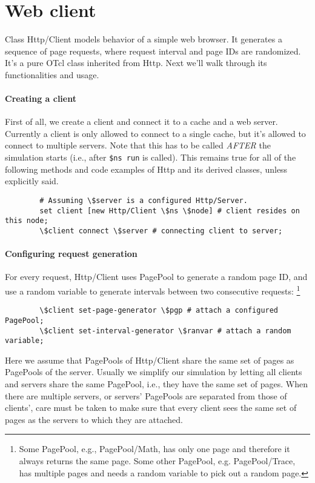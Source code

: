 \section{Web client}
\label{sec:webcache-client}

Class Http/Client models behavior of a simple web browser. It
generates a sequence of page requests, where request interval and page 
IDs are randomized. It's a pure OTcl class inherited from Http. 
Next we'll walk through its functionalities and usage.

\paragraph{Creating a client}

First of all, we create a client and connect it to a cache and a web server.
Currently a client is only allowed to connect to a single cache, but it's 
allowed to connect to multiple servers. Note that this has to be called 
\emph{AFTER} the simulation starts (i.e., after {\tt \$ns run} %
is called).
This remains true for all of the following methods and code examples of 
Http and its derived classes, unless explicitly said.

\begin{verbatim}
        # Assuming \$server is a configured Http/Server. 
        set client [new Http/Client \$ns \$node] # client resides on this node;
        \$client connect \$server # connecting client to server;
\end{verbatim} %

\paragraph{Configuring request generation}

For every request, Http/Client uses PagePool to generate a random page
ID, and use a random variable to generate intervals between two 
consecutive requests:
\footnote{Some PagePool,
e.g., PagePool/Math, has only one page and therefore it always returns the
same page. Some other PagePool, e.g. PagePool/Trace, has multiple pages 
and needs a random variable to pick out a random page.} 

\begin{verbatim}
        \$client set-page-generator \$pgp # attach a configured PagePool;
        \$client set-interval-generator \$ranvar # attach a random variable;
\end{verbatim}

Here we assume that PagePools of Http/Client share the same set of pages
as PagePools of the server. Usually we simplify our simulation by letting
all clients and servers share the same PagePool, i.e., they have the same
set of pages. When there are multiple servers, or servers' PagePools 
are separated from those of clients', care must be taken to make sure that 
every client sees the same set of pages as the servers to which they are
attached.


